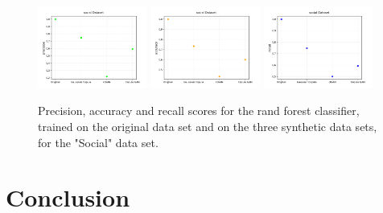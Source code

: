 \documentclass{article}
\begin{document}
\begin{figure}[h!]
	\centering
	\includegraphics[width=0.32\textwidth]{../plots/results/social_precision.png}
	\includegraphics[width=0.32\textwidth]{../plots/results/social_accuracy.png}
	\includegraphics[width=0.32\textwidth]{../plots/results/social_recall.png}
	
	\caption{Precision, accuracy and recall scores for the rand forest classifier, trained on the original data set and on the three synthetic data sets, for the "Social" data set.}
	\label{scores_social}
\end{figure}




\clearpage
\section{Conclusion}

\clearpage
{}

\end{document}
